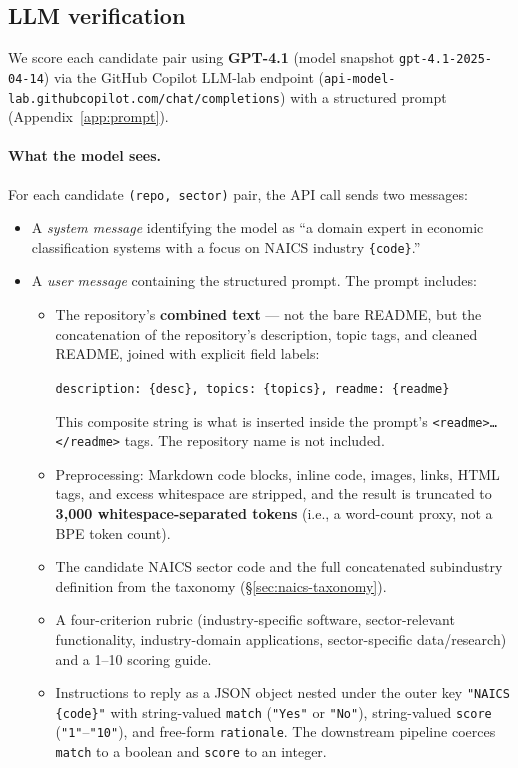 \documentclass{article}
\begin{document}
\subsection{LLM verification}
\label{sec:verification}

We score each candidate pair using \textbf{GPT-4.1} (model snapshot
\texttt{gpt-4.1-2025-04-14}) via the GitHub Copilot LLM-lab endpoint
(\texttt{api-model-lab.githubcopilot.com/chat/completions}) with a
structured prompt (Appendix~\ref{app:prompt}).

\paragraph{What the model sees.}
For each candidate \texttt{(repo, sector)} pair, the API call sends two
messages:
\begin{itemize}
  \item A \emph{system message} identifying the model as ``a domain
    expert in economic classification systems with a focus on NAICS
    industry \texttt{\{code\}}.''
  \item A \emph{user message} containing the structured prompt. The
    prompt includes:
    \begin{itemize}
      \item The repository's \textbf{combined text} --- not the bare
        README, but the concatenation of the repository's description,
        topic tags, and cleaned README, joined with explicit field
        labels:
        \begin{center}
        \small
        \texttt{description: \{desc\}, topics: \{topics\}, readme: \{readme\}}
        \end{center}
        This composite string is what is inserted inside the prompt's
        \texttt{<readme>\ldots</readme>} tags. The repository name is
        not included.
      \item Preprocessing: Markdown code blocks, inline code, images,
        links, HTML tags, and excess whitespace are stripped, and the
        result is truncated to \textbf{3{,}000 whitespace-separated
        tokens} (i.e., a word-count proxy, not a BPE token count).
      \item The candidate NAICS sector code and the full concatenated
        subindustry definition from the taxonomy
        (\S\ref{sec:naics-taxonomy}).
      \item A four-criterion rubric (industry-specific software,
        sector-relevant functionality, industry-domain applications,
        sector-specific data/research) and a 1--10 scoring guide.
      \item Instructions to reply as a JSON object nested under the
        outer key \texttt{"NAICS \{code\}"} with string-valued
        \texttt{match} (\texttt{"Yes"} or \texttt{"No"}),
        string-valued \texttt{score} (\texttt{"1"}--\texttt{"10"}),
        and free-form \texttt{rationale}. The downstream pipeline
        coerces \texttt{match} to a boolean and \texttt{score} to an
        integer.
    \end{itemize}
\end{itemize}
\end{document}
